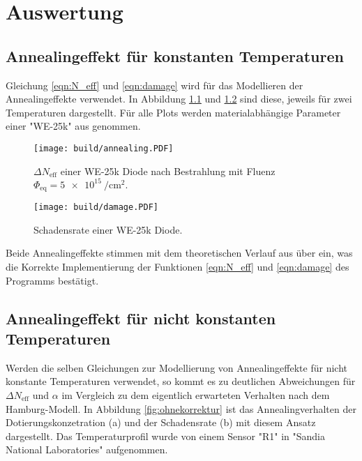 \chapter{Auswertung}\label{make}
\section{Annealingeffekt für konstanten Temperaturen}
Gleichung \ref{eqn:N_eff} und \ref{eqn:damage}  wird für das Modellieren der Annealingeffekte verwendet. In
Abbildung \ref{fig:N_eff} und \ref{fig:damage} sind diese, jeweils für zwei Temperaturen dargestellt.
Für alle Plots werden materialabhängige
Parameter einer "WE-25k" aus \cite{moll} genommen.

\begin{figure}
    \texttt{[image: build/annealing.PDF]}
    \caption{$\Delta N_{\mathrm{eff}}$ einer WE-25k Diode nach Bestrahlung mit Fluenz $\Phi_{\mathrm{eq}} = \SI{5e15}{\per\centi\meter\squared}.$}
    \label{fig:N_eff}
\end{figure}

\begin{figure}
    \texttt{[image: build/damage.PDF]}
    \caption{Schadensrate einer WE-25k Diode.}
    \label{fig:damage}
\end{figure}

Beide Annealingeffekte stimmen mit dem theoretischen Verlauf aus \cite{moll} über ein, was
die Korrekte Implementierung der Funktionen \ref{eqn:N_eff} und \ref{eqn:damage}  des Programms
bestätigt.



\section{Annealingeffekt für nicht konstanten Temperaturen}{\label{nicht_konstant}}
Werden die selben Gleichungen zur Modellierung von Annealingeffekte für nicht
konstante Temperaturen verwendet, so kommt es zu deutlichen Abweichungen für
$\Delta N_{\mathrm{eff}}$ und $\alpha$ im Vergleich zu dem eigentlich erwarteten
Verhalten nach dem Hamburg-Modell. In Abbildung \ref{fig:ohnekorrektur} ist das Annealingverhalten
der Dotierungskonzetration (a) und der Schadensrate (b) mit
diesem Ansatz dargestellt. Das Temperaturprofil wurde von einem Sensor "R1" in
"Sandia National Laboratories" aufgenommen.


